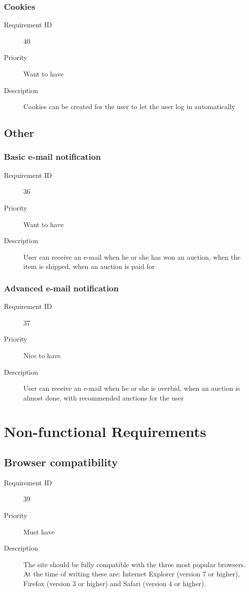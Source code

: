 		\subsubsection{Cookies}
			\begin{description}
				\item[Requirement ID] 40
				\item[Priority] Want to have
				\item[Description] Cookies can be created for the user to let the user log in 
					automatically
			\end{description}
	\subsection{Other}
		\subsubsection{Basic e-mail notification}
			\begin{description}
				\item[Requirement ID] 36
				\item[Priority] Want to have
				\item[Description] User can receive an e-mail when he or she has won an auction,
					when the item is shipped, when an auction is paid for
			\end{description}
		\subsubsection{Advanced e-mail notification}
			\begin{description}
				\item[Requirement ID] 37
				\item[Priority] Nice to have
				\item[Description] User can receive an e-mail when he or she is overbid,
					when an auction is almost done, with recommended auctions for the user
			\end{description}
\section{Non-functional Requirements}
	\subsection{Browser compatibility}
		\begin{description}
			\item[Requirement ID] 39
			\item[Priority] Must have
			\item[Description] The site should be fully compatible with the three most popular browsers. At the time of writing these are: Internet Explorer (version 7 or higher), Firefox (version 3 or higher) and Safari (version 4 or higher)\cite{browsers}.
		\end{description}
